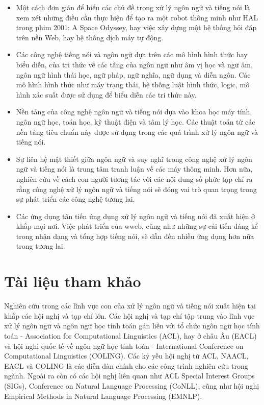 \begin{itemize}
  \item Một cách đơn giản để hiểu các chủ đề trong xử lý ngôn ngữ và tiếng nói là xem xét những điều cần thực hiện để tạo ra một robot thông minh như HAL trong phim 2001: A Space Odyssey, hay việc xây dựng một hệ thống hỏi đáp trên nền Web, hay hệ thống dịch máy tự động.
  \item Các công nghệ tiếng nói và ngôn ngữ dựa trên các mô hình hình thức hay biểu diễn, của tri thức về các tầng của ngôn ngữ như âm vị học và ngữ âm, ngôn ngữ hình thái học, ngữ pháp, ngữ nghĩa, ngữ dụng và diễn ngôn. Các mô hình hình thức như máy trạng thái, hệ thống luật hình thức, logic, mô hình xác suất được sử dụng để biểu diễn các tri thức này.
  \item Nền tảng của công nghệ ngôn ngữ và tiếng nói dựa vào khoa học máy tính, ngôn ngữ học, toán học, kỹ thuật điện và tâm lý học. Các thuật toán từ các nền tảng tiêu chuẩn này được sử dụng trong các quá trình xử lý ngôn ngữ và tiếng nói.
  \item Sự liên hệ mật thiết giữa ngôn ngữ và suy nghĩ trong công nghệ xử lý ngôn ngữ và tiếng nói là trung tâm tranh luận về các máy thông minh. Hơn nữa, nghiên cứu về cách con người tương tác với các nội dung số phức tạp chỉ ra rằng công nghệ xử lý ngôn ngữ và tiếng nói sẽ đóng vai trò quan trọng trong sự phát triển các công nghệ tương lai.
  \item Các ứng dụng tân tiến ứng dụng xử lý ngôn ngữ và tiếng nói đã xuất hiện ở khắp mọi nơi. Việc phát triển của wweb, cũng như những sự cải tiến đáng kể trong nhận dạng và tổng hợp tiếng nói, sẽ dẫn đến nhiều ứng dụng hơn nữa trong tương lai.
\end{itemize}

\section{Tài liệu tham khảo}

Nghiên cứu trong các lĩnh vực con của xử lý ngôn ngữ và tiếng nói xuất hiện tại khắp các hội nghị và tạp chí lớn. Các hội nghị và tạp chí tập trung vào lĩnh vực xử lý ngôn ngữ và ngôn ngữ học tính toán gán liền với tổ chức ngôn ngữ học tính toán - Association for Computational Linguistics (ACL), hay ở châu Âu (EACL) và hội nghị quốc tế về ngôn ngữ học tính toán - International Conference on Computational Linguistics (COLING). Các kỷ yếu hội nghị từ ACL, NAACL, EACL và COLING là các diễn đàn chính cho các công trình nghiên cứu trong ngành. Ngoài ra còn có các hội nghị liên quan như ACL Special Interest Groups (SIGs), Conference on Natural Language Processing (CoNLL), cũng như hội nghị Empirical Methods in Natural Language Processing (EMNLP).

